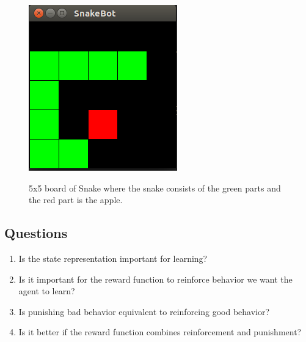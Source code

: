 \documentclass[report.tex]{subfiles}
\begin{document}
    \begin{figure}[H]
        \centering
        \includegraphics[scale=0.5]{././images/snake}
        \label{fig:snake}
        \caption{5x5 board of Snake where the snake consists of the green parts and the red part is the apple.}
    \end{figure}

    \subsection*{Questions}

    \begin{enumerate}
        \item Is the state representation important for learning?
        \item Is it important for the reward function to reinforce behavior we want the agent to learn?
        \item Is punishing bad behavior equivalent to reinforcing good behavior?
        \item Is it better if the reward function combines reinforcement and punishment?
    \end{enumerate}
\end{document}
